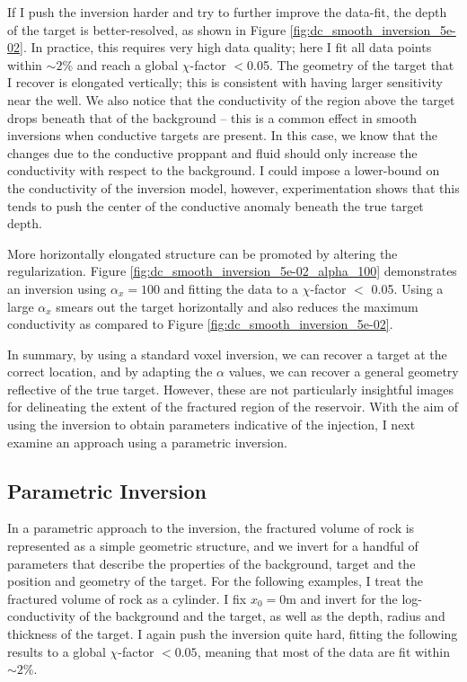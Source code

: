 






If I push the inversion harder and try to further improve the data-fit, the depth of the target is better-resolved, as shown in Figure \ref{fig:dc_smooth_inversion_5e-02}. In practice, this requires very high data quality; here I fit all data points within $\sim2\%$ and reach a global $\chi$-factor $<$0.05. The geometry of the target that I recover is elongated vertically; this is consistent with having larger sensitivity near the well. We also notice that the conductivity of the region above the target drops beneath that of the background -- this is a common effect in smooth inversions when conductive targets are present. In this case, we know that the changes due to the conductive proppant and fluid should only increase the conductivity with respect to the background. I could impose a lower-bound on the conductivity of the inversion model, however, experimentation shows that this tends to push the center of the conductive anomaly beneath the true target depth.




More horizontally elongated structure can be promoted by altering the regularization. Figure \ref{fig:dc_smooth_inversion_5e-02_alpha_100} demonstrates an inversion using $\alpha_x=100$ and fitting the data to a $\chi$-factor $<$ 0.05. Using a large $\alpha_x$ smears out the target horizontally and also reduces the maximum conductivity as compared to Figure \ref{fig:dc_smooth_inversion_5e-02}.




In summary, by using a standard voxel inversion, we can recover a target at the correct location, and by adapting the $\alpha$ values, we can recover a general geometry reflective of the true target. However, these are not particularly insightful images for delineating the extent of the fractured region of the reservoir. With the aim of using the inversion to obtain parameters indicative of the injection, I next examine an approach using a parametric inversion.
\subsection{Parametric Inversion}
In a parametric approach to the inversion, the fractured volume of rock is represented as a simple geometric structure, and we invert for a handful of parameters that describe the properties of the background, target and the position and geometry of the target. For the following examples, I treat the fractured volume of rock as a cylinder. I fix $x_0 = 0$m and invert for the log-conductivity of the background and the target, as well as the depth, radius and thickness of the target. I again push the inversion quite hard, fitting the following results to a global $\chi$-factor $<0.05$, meaning that most of the data are fit within $\sim 2\%$.

